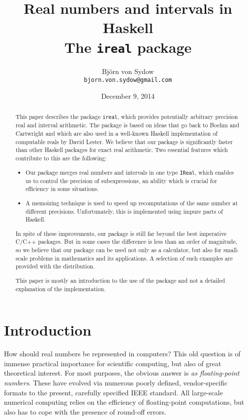 \documentclass[9pt, a4, twocolumn]{article}
\title{
Real numbers and intervals in Haskell\\
The \texttt{ireal} package}
\author{Bj\"orn von Sydow\\
       {\texttt{bjorn.von.sydow@gmail.com}}}
\date{December 9, 2014 }
\begin{document}
\maketitle
\begin{abstract}
This paper describes the package \texttt{ireal}, which provides
potentially arbitrary precision real and interval arithmetic. The
package is based on ideas that go back to Boehm and Cartwright 
and which are also used in a well-known Haskell implementation
of computable reals by David Lester. We believe that our package is
significantly faster than other Haskell packages for exact real arithmetic.
Two essential features which contribute to this are
the following:
\begin{itemize}
\item Our package merges real numbers 
and intervals in one type \texttt{IReal}, which enables us to
control the precision of subexpressions, an ability which is crucial
for efficiency in some situations.
\item  A memoizing technique is used to speed up recomputations of the
  same number at different precisions. Unfortunately, this is implemented using impure
parts of Haskell. 
\end{itemize}
In spite of these improvements, our package is still far beyond the best imperative
C/C++ packages. But in some cases the difference is less than an order
of magnitude, so we  believe that our package can be used not only
as a calculator, but also for small-scale problems in mathematics and
its applications. A selection of such examples are provided with
the distribution.

This paper is mostly an introduction to the use of
the package  and not a detailed explanation of the implementation.

\end{abstract}
\section{Introduction}

How should real numbers be represented in computers? This old question is
of immense practical importance for scientific computing, but also of
great theoretical interest. For most purposes, the obvious answer is 
\emph{as floating-point numbers}. These have evolved via numerous poorly 
defined, vendor-specific formats to the present, carefully specified
IEEE standard. All large-scale numerical computing relies on the
efficiency of floating-point computations, but also has to cope with
the presence of round-off errors.
\end{document}
